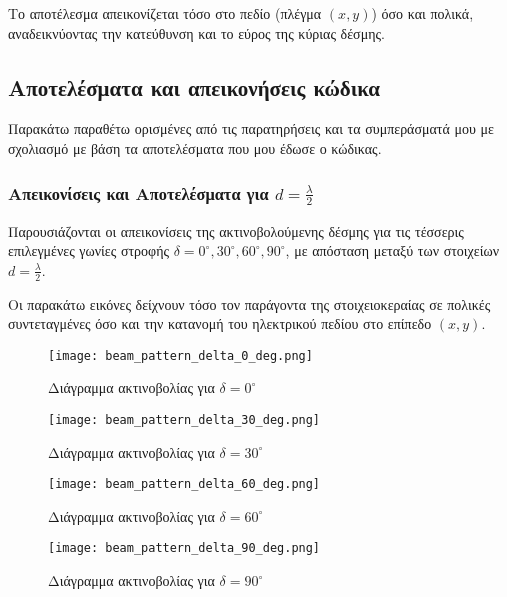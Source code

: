 \documentclass[a4paper,12pt]{report}
\begin{document}
\hspace{-0.6cm}Το αποτέλεσμα απεικονίζεται τόσο στο πεδίο (πλέγμα \((x,y)\)) όσο και πολικά, αναδεικνύοντας την κατεύθυνση και το εύρος της κύριας δέσμης.

\newpage

\subsection{Αποτελέσματα και απεικονήσεις κώδικα}
Παρακάτω παραθέτω ορισμένες από τις παρατηρήσεις και τα συμπεράσματά μου με σχολιασμό με βάση τα αποτελέσματα που μου έδωσε ο κώδικας.
\subsubsection{Απεικονίσεις και Αποτελέσματα για \( d = \frac{\lambda}{2} \)}

Παρουσιάζονται οι απεικονίσεις της ακτινοβολούμενης δέσμης για τις τέσσερις επιλεγμένες γωνίες στροφής \( \delta = 0^\circ, 30^\circ, 60^\circ, 90^\circ \), με απόσταση μεταξύ των στοιχείων \( d = \frac{\lambda}{2} \).

\vspace{0.3cm}

\hspace{-0.6cm}Οι παρακάτω εικόνες δείχνουν τόσο τον παράγοντα της στοιχειοκεραίας σε πολικές συντεταγμένες όσο και την κατανομή του ηλεκτρικού πεδίου στο επίπεδο \((x,y)\).

\begin{figure}[H]
    \centering
    \begin{minipage}[b]{0.48\textwidth}
        \centering
        \texttt{[image: beam\_pattern\_delta\_0\_deg.png]}
        \caption{Διάγραμμα ακτινοβολίας για \( \delta = 0^\circ \)}
    \end{minipage}
    \hfill
    \begin{minipage}[b]{0.48\textwidth}
        \centering
        \texttt{[image: beam\_pattern\_delta\_30\_deg.png]}
        \caption{Διάγραμμα ακτινοβολίας για \( \delta = 30^\circ \)}
    \end{minipage}
\end{figure}

\begin{figure}[H]
    \centering
    \begin{minipage}[b]{0.48\textwidth}
        \centering
        \texttt{[image: beam\_pattern\_delta\_60\_deg.png]}
        \caption{Διάγραμμα ακτινοβολίας για \( \delta = 60^\circ \)}
    \end{minipage}
    \hfill
    \begin{minipage}[b]{0.48\textwidth}
        \centering
        \texttt{[image: beam\_pattern\_delta\_90\_deg.png]}
        \caption{Διάγραμμα ακτινοβολίας για \( \delta = 90^\circ \)}
    \end{minipage}
\end{figure}
\end{document}
